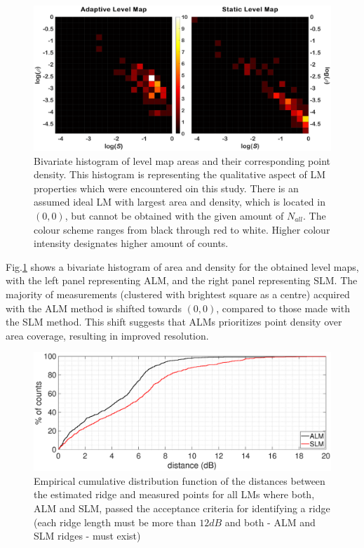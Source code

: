 \documentclass[journal,twoside,web]{ieeecolor2}
\begin{document}
\begin{figure}
\centering
\includegraphics[width=.8\textwidth]{Fig_8_Coverage_sameClim.eps} %
\caption{Bivariate histogram of level map areas and their corresponding point density. This histogram is representing the qualitative aspect of LM properties which were encountered oin this study. There is an assumed ideal LM with largest area and density, which is located in $(0, 0)$, but cannot be obtained with the given amount of $N_{all}$. The colour scheme ranges from black through red to white. Higher colour intensity designates higher amount of counts.}
\label{fig_TGT}
\end{figure}

Fig.\ref{fig_TGT} shows a bivariate histogram of area and density for the obtained level maps, with the left panel representing ALM, and the right panel representing SLM. The majority of measurements (clustered with brightest square as a centre) acquired with the ALM method is shifted towards $(0, 0)$, compared to those made with the SLM method. This shift suggests that ALMs prioritizes point density over area coverage, resulting in improved resolution.


\begin{figure}[ht]
\centerline{\includegraphics[width=\columnwidth]{Fig_9_Cumula.eps}}
\caption{Empirical cumulative distribution function of the distances between the estimated ridge and measured points for all LMs where both, ALM and SLM, passed the acceptance criteria for identifying a ridge (each ridge length must be more than $12dB$ and both - ALM and SLM ridges - must exist)}
\label{fig_CDF}
\end{figure}
\end{document}
